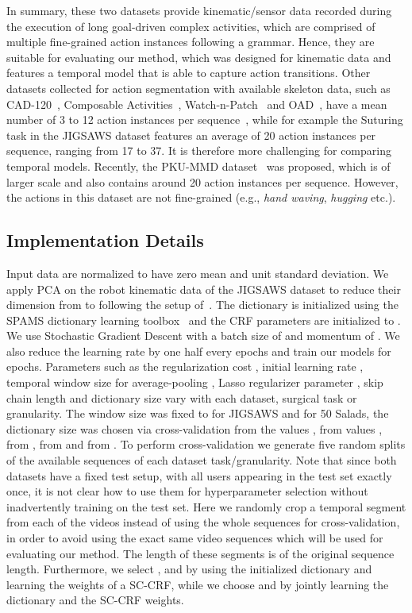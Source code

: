 \documentclass[10pt,twocolumn,letterpaper]{article}
\begin{document}
In summary, these two datasets provide kinematic/sensor data recorded during the execution of long goal-driven complex activities, which are comprised of multiple fine-grained action instances following a grammar. Hence, they are suitable for evaluating our method, which was designed for kinematic data and features a temporal model that is able to capture action transitions. Other datasets collected for action segmentation with available skeleton data, such as CAD-120~\cite{Koppula:IJRR13}, Composable Activities~\cite{Lillo:CVPR14}, Watch-n-Patch~\cite{Wu:CVPR15} and OAD~\cite{De:ECCV16}, have a mean number of 3 to 12 action instances per sequence~\cite{Liu:CoRR17}, while for example the Suturing task in the JIGSAWS dataset features an average of 20 action instances per sequence, ranging from 17 to 37. It is therefore more challenging for comparing temporal models. Recently, the PKU-MMD dataset~\cite{Liu:CoRR17} was proposed, which is of larger scale and also contains around 20 action instances per sequence. However, the actions in this dataset are not fine-grained (e.g., \emph{hand waving}, \emph{hugging} etc.).
\subsection{Implementation Details}
Input data are normalized to have zero mean and unit standard deviation. We apply PCA on the robot kinematic data of the JIGSAWS dataset to reduce their dimension from  to  following the setup of~\cite{Sefati:M2CAI15}. The dictionary is initialized using the SPAMS dictionary learning toolbox~\cite{Mairal:JMLR2010} and the CRF parameters are initialized to . We use Stochastic Gradient Descent with a batch size of  and momentum of . We also reduce the learning rate by one half every  epochs and train our models for  epochs. Parameters such as the regularization cost , initial learning rate , temporal window size for average-pooling , Lasso regularizer parameter , skip chain length  and dictionary size  vary with each dataset, surgical task or granularity. The window size was fixed to  for JIGSAWS and  for 50 Salads, the dictionary size  was chosen via cross-validation from the values ,  from values ,  from ,  from  and  from . To perform cross-validation we generate five random splits of the available sequences of each dataset task/granularity. Note that since both datasets have a fixed test setup, with all users appearing in the test set exactly once, it is not clear how to use them for hyperparameter selection without inadvertently training on the test set. Here we randomly crop a temporal segment from each of the videos instead of using the whole sequences for cross-validation, in order to avoid using the exact same video sequences which will be used for evaluating our method. The length of these segments is  of the original sequence length. Furthermore, we select ,  and  by using the initialized dictionary  and learning the weights of a SC-CRF, while we choose  and  by jointly learning the dictionary and the SC-CRF weights. 
\end{document}
